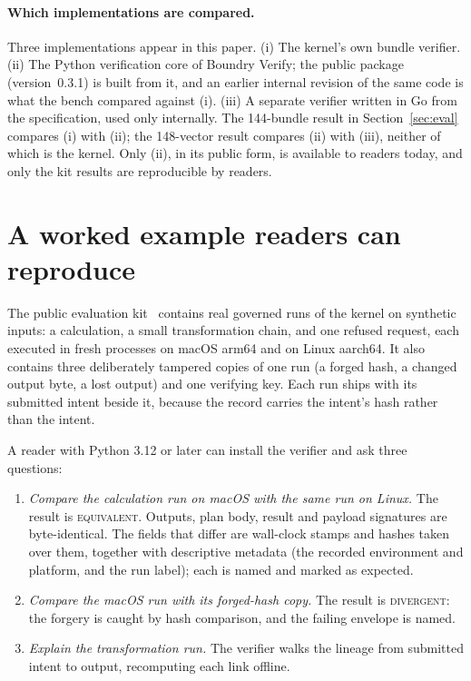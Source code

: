 \documentclass[11pt,a4paper]{article}
\begin{document}
\paragraph{Which implementations are compared.} Three implementations appear in this paper. (i) The kernel's own bundle verifier. (ii) The Python verification core of Boundry Verify; the public package (version~0.3.1) is built from it, and an earlier internal revision of the same code is what the bench compared against (i). (iii) A separate verifier written in Go from the specification, used only internally. The 144-bundle result in Section~\ref{sec:eval} compares (i) with (ii); the 148-vector result compares (ii) with (iii), neither of which is the kernel. Only (ii), in its public form, is available to readers today, and only the kit results are reproducible by readers.

\section{A worked example readers can reproduce}\label{sec:example}

The public evaluation kit~\citep{boundryverify} contains real governed runs of the kernel on synthetic inputs: a calculation, a small transformation chain, and one refused request, each executed in fresh processes on macOS arm64 and on Linux aarch64. It also contains three deliberately tampered copies of one run (a forged hash, a changed output byte, a lost output) and one verifying key. Each run ships with its submitted intent beside it, because the record carries the intent's hash rather than the intent.

A reader with Python 3.12 or later can install the verifier and ask three questions:

\begin{enumerate}
  \item \emph{Compare the calculation run on macOS with the same run on Linux.} The result is \textsc{equivalent}. Outputs, plan body, result and payload signatures are byte-identical. The fields that differ are wall-clock stamps and hashes taken over them, together with descriptive metadata (the recorded environment and platform, and the run label); each is named and marked as expected.
  \item \emph{Compare the macOS run with its forged-hash copy.} The result is \textsc{divergent}: the forgery is caught by hash comparison, and the failing envelope is named.
  \item \emph{Explain the transformation run.} The verifier walks the lineage from submitted intent to output, recomputing each link offline.
\end{enumerate}
\end{document}
